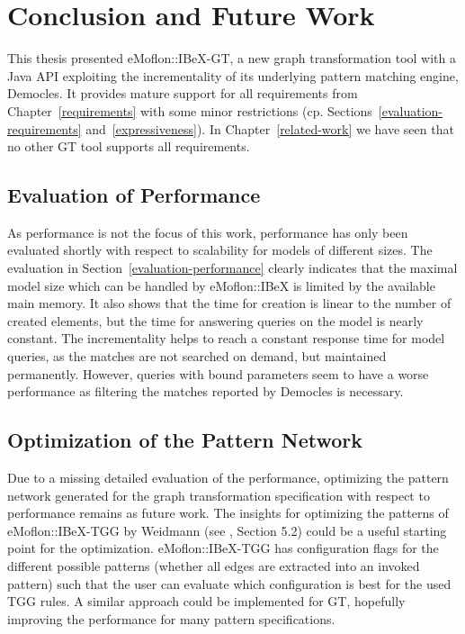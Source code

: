 
\chapter{Conclusion and Future Work}
\label{future-work}
This thesis presented eMoflon::IBeX-GT, a new graph transformation tool with a Java API exploiting the incrementality of its underlying pattern matching engine, Democles.
It provides mature support for all requirements from Chapter~\ref{requirements} with some minor restrictions (cp. Sections~\ref{evaluation-requirements} and~\ref{expressiveness}).
In Chapter~\ref{related-work} we have seen that no other GT tool supports all requirements.

\section{Evaluation of Performance}
\label{evaluation-of-performance}
As performance is not the focus of this work, performance has only been evaluated shortly with respect to scalability for models of different sizes.
The evaluation in Section~\ref{evaluation-performance} clearly indicates that the maximal model size which can be handled by eMoflon::IBeX is limited by the available main memory.
It also shows that the time for creation is linear to the number of created elements, but the time for answering queries on the model is nearly constant.
The incrementality helps to reach a constant response time for model queries, as the matches are not searched on demand, but maintained permanently.
However, queries with bound parameters seem to have a worse performance as filtering the matches reported by Democles is necessary.

\section{Optimization of the Pattern Network}
\label{pattern-optimization}
Due to a missing detailed evaluation of the performance, optimizing the pattern network generated for the graph transformation specification with respect to performance remains as future work.
The insights for optimizing the patterns of eMoflon::IBeX-TGG by Weidmann (see \cite{ConsistencyManagementViaCombinationOfTGGAndILP}, Section 5.2) could be a useful starting point for the optimization.
eMoflon::IBeX-TGG has configuration flags for the different possible patterns (\eg whether all edges are extracted into an invoked pattern) such that the user can evaluate which configuration is best for the used TGG rules.
A similar approach could be implemented for GT, hopefully improving the performance for many pattern specifications.

